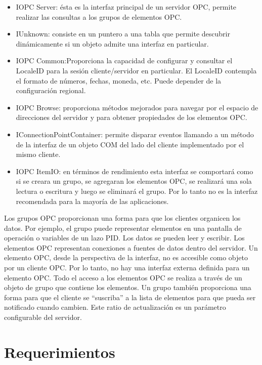 
\begin{itemize}
\item IOPC Server: ésta es la interfaz principal de un servidor OPC, permite realizar las consultas a los grupos de elementos OPC.
\item IUnknown: consiste en un puntero a una tabla que permite descubrir dinámicamente si un objeto admite una interfaz en particular.
\item IOPC Common:Proporciona la capacidad de configurar y consultar el LocaleID para la sesión cliente/servidor en particular. El LocaleID contempla el formato de números, fechas, moneda, etc. Puede depender de la configuración regional.
\item IOPC Browse: proporciona métodos mejorados para navegar por el espacio de direcciones del servidor y para
obtener propiedades de los elementos OPC.
\item IConnectionPointContainer: permite disparar eventos llamando a un método de la interfaz de un objeto COM del lado del cliente implementado por el mismo cliente.
\item IOPC ItemIO: en términos de rendimiento esta interfaz se comportará como si se creara un grupo, se agregaran los elementos OPC, se realizará una sola lectura o escritura y luego se eliminará el grupo. Por lo tanto no es la interfaz recomendada para la mayoría de las aplicaciones.
\end{itemize}

Los grupos OPC proporcionan una forma para que los clientes organicen los datos. Por ejemplo, el grupo puede representar elementos en una pantalla de operación o variables de un lazo PID. Los datos se pueden leer y escribir. Los elementos OPC representan conexiones a fuentes de datos dentro del servidor. Un elemento OPC, desde la perspectiva de la interfaz, no es accesible como objeto por un cliente OPC. Por lo tanto, no hay una interfaz externa definida para un elemento OPC. Todo el acceso a los elementos OPC se realiza a través de un objeto de grupo que contiene los elementos. Un grupo también proporciona una forma para que el cliente se ``suscriba'' a la lista de elementos para que pueda ser notificado cuando cambien. Este ratio de actualización es un parámetro configurable del servidor.


\section{Requerimientos}


